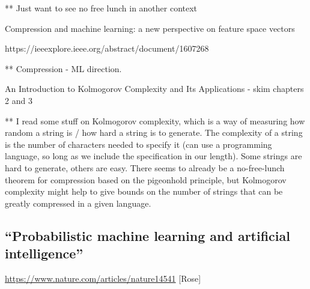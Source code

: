 \documentclass[12pt]{article}
\begin{document}
** Just want to see no free lunch in another context

\bigskip

Compression and machine learning: a new perspective on feature space vectors

https://ieeexplore.ieee.org/abstract/document/1607268

** Compression - ML direction. 


\bigskip

An Introduction to Kolmogorov Complexity and Its Applications - skim chapters 2 and 3

** I read some stuff on Kolmogorov complexity, which is a way of measuring how random a string is / how hard a string is to generate. The complexity of a string is the number of characters needed to specify it (can use a programming language, so long as we include the specification in our length). Some strings are hard to generate, others are easy. There seems to already be a no-free-lunch theorem for compression based on the pigeonhold principle, but Kolmogorov complexity might help to give bounds on the number of strings that can be greatly compressed in a given language. 

\newpage

\subsection*{“Probabilistic machine learning and artificial intelligence”}
\url{https://www.nature.com/articles/nature14541} [Rose]
\end{document}
